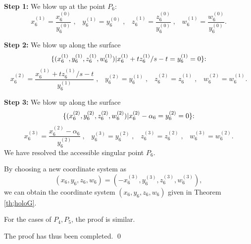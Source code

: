 {\bf Step 1:} We blow up at the point $P_6${\rm : \rm}
$$
{x_{6}^{(1)}}=\frac{x_{6}^{(0)}}{y_{6}^{(0)}} \;, \;\;\; {y_{6}^{(1)}}=y_{6}^{(0)} \;, \;\;\; {z_{6}^{(1)}}=\frac{z_{6}^{(0)}}{y_{6}^{(0)}} \;, \;\;\; {w_{6}^{(1)}}=\frac{w_{6}^{(0)}}{y_{6}^{(0)}}.
$$




{\bf Step 2:} We blow up along the surface
\begin{equation*}
\{(x_{6}^{(1)},y_{6}^{(1)},z_{6}^{(1)},w_{6}^{(1)})|x_{6}^{(1)}+tz_{6}^{(1)}/s-t=y_{6}^{(1)}=0\}{\rm : \rm}
\end{equation*}
$$
{x_{6}^{(2)}}=\frac{x_{6}^{(1)}+tz_{6}^{(1)}/s-t}{y_{6}^{(1)}} \;, \;\;\; {y_{6}^{(2)}}=y_{6}^{(1)} \;, \;\;\; {z_{6}^{(2)}}=z_{6}^{(1)} \;, \;\;\; {w_{6}^{(2)}}=w_{6}^{(1)}.
$$





{\bf Step 3:} We blow up along the surface
\begin{equation*}
\{(x_{6}^{(2)},y_{6}^{(2)},z_{6}^{(2)},w_{6}^{(2)})|x_{6}^{(2)}-\alpha_6=y_{6}^{(2)}=0\}{\rm : \rm}
\end{equation*}
$$
{x_{6}^{(3)}}=\frac{x_{6}^{(2)}-\alpha_6}{y_{6}^{(2)}} \;, \;\;\; {y_{6}^{(3)}}=y_{6}^{(2)} \;, \;\;\; {z_{6}^{(3)}}=z_{6}^{(2)} \;, \;\;\; {w_{6}^{(3)}}=w_{6}^{(2)}.
$$
We have resolved the accessible singular point $P_6$.

By choosing a new coordinate system as
$$
(x_6,y_6,z_6,w_6)=(-x_{6}^{(3)},y_{6}^{(3)},z_{6}^{(3)},w_{6}^{(3)}),
$$
we can obtain the coordinate system $(x_6,y_6,z_6,w_6)$ given in Theorem \ref{th;holoG}.

For the cases of $P_4,P_5$, the proof is similar.

The proof has thus been completed.  \qed

